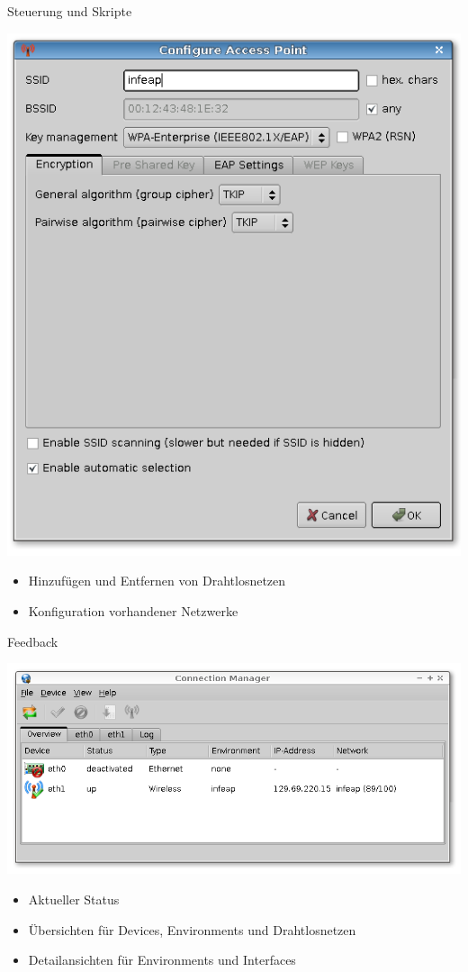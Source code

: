 \begin{frame}[<+-| alert@+>]{Steuerung und Skripte}

		\includegraphics[scale=0.25]{qnut_netconfig.png}

	\begin{itemize}
		\item Hinzufügen und Entfernen von Drahtlosnetzen
		\item Konfiguration vorhandener Netzwerke
	\end{itemize}
\end{frame}

\begin{frame}[<+-| alert@+>]{Feedback}

		\includegraphics[scale=0.25]{qnut_overview.png}

	\begin{itemize}
		\item Aktueller Status
		\item Übersichten für Devices, Environments und Drahtlosnetzen
		\item Detailansichten für Environments und Interfaces
	\end{itemize}
\end{frame}
